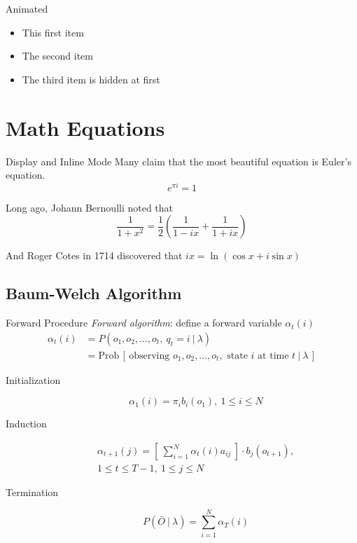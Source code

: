 \documentclass[10pt]{beamer}
\begin{document}
\begin{frame}{Animated}
  \begin{itemize}
    \item <1-> This first item
    \item <1-> The second item
    \item <2-> The third item is hidden at first
  \end{itemize}
\end{frame}

\section{Math Equations}

\begin{frame}{Display and Inline Mode}
  Many claim that the most beautiful equation is Euler's equation.
  \[ e^{\pi i} = 1 \]
  
  Long ago, Johann Bernoulli noted that
  $$ \frac{1}{1+x^2} = \frac{1}{2}\left( \frac{1}{1-ix} + \frac{1}{1+ix} \right) $$
  
  And Roger Cotes in 1714 discovered that $ ix = \ln(\cos x + i \sin x) $
\end{frame}

\subsection{Baum-Welch Algorithm}

\begin{frame}{Forward Procedure}
  \textit{Forward algorithm}: define a forward variable $\alpha_t(i)$
  \begin{align}
    \alpha_t (i)
    &= P(o_1, o_2, \dots, o_t,\ q_t = i\ |\ \lambda) \\
    &= \text{Prob}\,[\,\text{observing } o_1, o_2, \dots, o_t, \text{ state } i \text{ at time } t\ |\ \lambda\,]
  \end{align}
  
  \begin{description}
    \item[Initialization]
    \begin{equation}
      \alpha_1(i) = \pi_i b_i (o_1),\ 1 \leq i \leq N
    \end{equation}
    \item[Induction]
    \begin{multline}
      \alpha_{t+1}(j) = \left[\ \sum_{i=1}^{N} \alpha_t(i) a_{i j}\ \right] \cdot b_j(o_{t+1}),\\
      1 \leq t \leq T-1,\ 1 \leq j \leq N
    \end{multline}
    \item[Termination]
    \begin{equation}
      P\left( \bar{O}\ |\ \lambda \right) = \sum_{i=1}^{N} \alpha_T(i)
    \end{equation}
  \end{description}
\end{frame}
\end{document}
